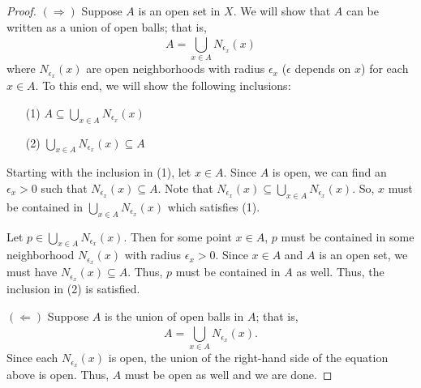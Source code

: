 \documentclass[a4paper]{article}
\begin{document}
\begin{enumerate}
    \begin{proof}
        \( (\Longrightarrow) \) Suppose \( A  \) is an open set in \( X  \). We will show that \( A  \) can be written as a union of open balls; that is,    
        \[  A = \bigcup_{ x \in A  }^{  } {N}_{{\epsilon}_{x}}(x) \]
        where \( {N}_{{\epsilon}_{x}}(x) \) are open neighborhoods with radius \( {\epsilon}_{x} \) (\( \epsilon \) depends on \( x \)) for each \( x \in A  \). To this end, we will show the following inclusions:
        \begin{enumerate}
            \item[(1)] \( A \subseteq \bigcup_{ x \in A  }^{  } {N}_{{\epsilon}_{x}}(x) \)
            \item[(2)] \( \bigcup_{ x \in A  }^{  } {N}_{{\epsilon}_{x}}(x) \subseteq A  \)
        \end{enumerate}
        Starting with the inclusion in (1), let \( x \in A  \). Since \( A  \) is open, we can find an \( {\epsilon}_{x} > 0  \) such that \( {N}_{{\epsilon}_{x}}(x) \subseteq A  \). Note that \( {N}_{{\epsilon}_{x}}(x) \subseteq \bigcup_{ x \in A  }^{  }  {N}_{{\epsilon}_{x}}(x)  \). So, \( x  \) must be contained in \( \bigcup_{ x \in A  }^{  } {N}_{{\epsilon}_{x}}(x) \) which satisfies (1).      
        
        Let \( p \in \bigcup_{ x \in A  }^{  } {N}_{{\epsilon}_{x}}(x)  \). Then for some point \( x \in A  \), \( p  \) must be contained in some neighborhood \( {N}_{{\epsilon}_{x}}(x) \) with radius \( {\epsilon}_{x} > 0  \). Since \( x \in A  \) and \( A  \) is an open set, we must have \( {N}_{{\epsilon}_{x}}(x) \subseteq A  \). Thus, \( p  \) must be contained in \( A  \) as well. Thus, the inclusion in (2) is satisfied. 

        \( (\Longleftarrow) \) Suppose \( A  \) is the union of open balls in \( A  \); that is, 
        \[  A = \bigcup_{ x \in A  }^{  } {N}_{{\epsilon}_{x}}(x). \]
        Since each \( {N}_{{\epsilon}_{x}}(x) \) is open, the union of the right-hand side of the equation above is open. Thus, \( A  \) must be open as well and we are done.


\end{proof}
\end{enumerate}
\end{document}

